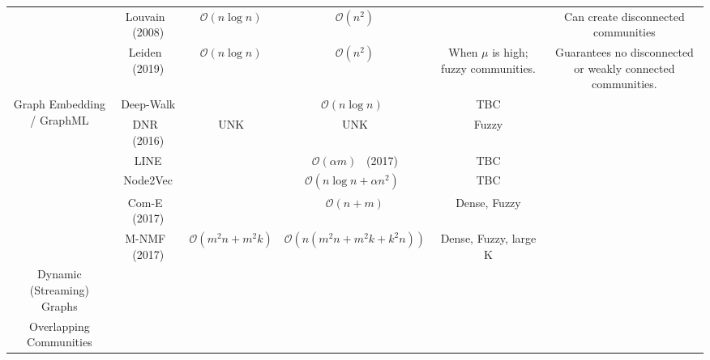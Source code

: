 \begin{landscape}
\begin{table}[t]
\begin{tabular}{|c|c|c|c|c|c|}
                                                  & Louvain~\cite{Blondel2008} (2008)     & $\mathcal{O}(n\log{n})$   & $\mathcal{O}(n^2)$ &  & Can create disconnected communities\\
                                                  
                                                  & Leiden~\cite{Traag2019} (2019)        & $\mathcal{O}(n\log{n})$   & $\mathcal{O}(n^2)$ & When $\mu$ is high; fuzzy communities.  & Guarantees no disconnected or weakly connected communities.  \\                                                
                                                  
        \hline
        \multirow{6}{*}{Graph Embedding / GraphML}  & Deep-Walk                   &   & $\mathcal{O}(n\log{n})$~\cite{Cavallari2017}  & TBC \\
                                          & DNR~\cite{Yang2016} (2016)  & UNK  & UNK  & Fuzzy \\
                                          
                                          & LINE                        &   & $\mathcal{O}(\alpha m)$~\cite{Cavallari2017} (2017) & TBC \\
                                          
                                          & Node2Vec                    &   & $\mathcal{O}(n\log{n}+\alpha n^2)$~\cite{Cavallari2017} & TBC \\
                                         
                                          & Com-E~\cite{Cavallari2017} (2017)  &   & $\mathcal{O}(n + m)$ & Dense, Fuzzy \\
                                          
                                          & M-NMF~\cite{Wang2017} (2017)  & $\mathcal{O}(m^2n + m^2k)$  & $\mathcal{O}(n(m^2n + m^2k + k^2n))$ & Dense, Fuzzy, large K \\
        \hline
        \multirow{3}{*}{Dynamic (Streaming) Graphs}   & & & & \\
                                            & & & & \\
                                            & & & & \\
        \hline
        \multirow{3}{*}{Overlapping Communities}    & & & & \\
                                                    & & & & \\
                                                    & & & & \\                                    

      
      \hline
      \end{tabular} 
    \end{table}
  \normalsize
  \end{landscape}
